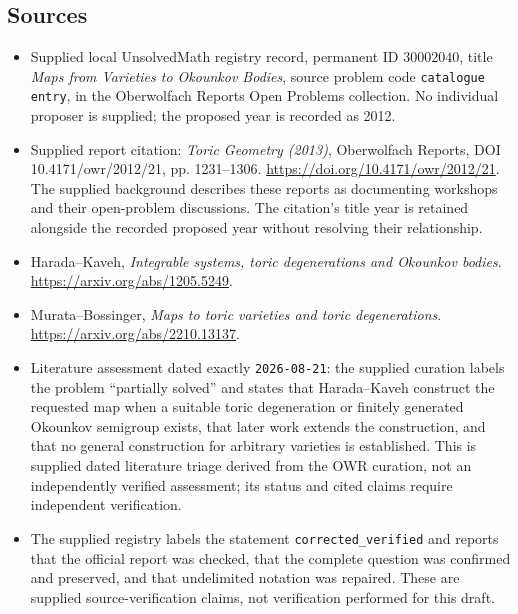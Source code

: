 \documentclass[11pt]{article}
\begin{document}
\subsection{Sources}
\begin{itemize}
\item Supplied local UnsolvedMath registry record, permanent ID \(30002040\), title \emph{Maps from Varieties to Okounkov Bodies}, source problem code \texttt{catalogue entry}, in the Oberwolfach Reports Open Problems collection. No individual proposer is supplied; the proposed year is recorded as 2012.
\item Supplied report citation: \emph{Toric Geometry (2013)}, Oberwolfach Reports, DOI 10.4171/owr/2012/21, pp. 1231--1306. \url{https://doi.org/10.4171/owr/2012/21}. The supplied background describes these reports as documenting workshops and their open-problem discussions. The citation's title year is retained alongside the recorded proposed year without resolving their relationship.
\item Harada--Kaveh, \emph{Integrable systems, toric degenerations and Okounkov bodies}. \url{https://arxiv.org/abs/1205.5249}.
\item Murata--Bossinger, \emph{Maps to toric varieties and toric degenerations}. \url{https://arxiv.org/abs/2210.13137}.
\item Literature assessment dated exactly \texttt{2026-08-21}: the supplied curation labels the problem ``partially solved'' and states that Harada--Kaveh construct the requested map when a suitable toric degeneration or finitely generated Okounkov semigroup exists, that later work extends the construction, and that no general construction for arbitrary varieties is established. This is supplied dated literature triage derived from the OWR curation, not an independently verified assessment; its status and cited claims require independent verification.
\item The supplied registry labels the statement \texttt{corrected\_verified} and reports that the official report was checked, that the complete question was confirmed and preserved, and that undelimited notation was repaired. These are supplied source-verification claims, not verification performed for this draft.
\end{itemize}
\end{document}
